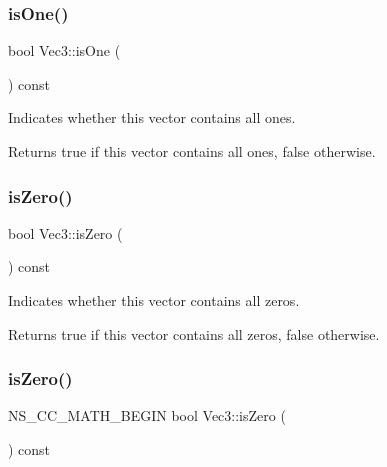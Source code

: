 \subsubsection{\texorpdfstring{is\+One()}{isOne()}\hspace{0.1cm}{\footnotesize\ttfamily [2/2]}}
{\footnotesize\ttfamily bool Vec3\+::is\+One (\begin{DoxyParamCaption}{ }\end{DoxyParamCaption}) const\hspace{0.3cm}{\ttfamily [inline]}}

Indicates whether this vector contains all ones.

\begin{DoxyReturn}{Returns}
true if this vector contains all ones, false otherwise. 
\end{DoxyReturn}
\mbox{\label{classVec3_ad6353b2ce203bb6ae4ae44317b00f86c}} 
\subsubsection{\texorpdfstring{is\+Zero()}{isZero()}\hspace{0.1cm}{\footnotesize\ttfamily [1/2]}}
{\footnotesize\ttfamily bool Vec3\+::is\+Zero (\begin{DoxyParamCaption}{ }\end{DoxyParamCaption}) const\hspace{0.3cm}{\ttfamily [inline]}}

Indicates whether this vector contains all zeros.

\begin{DoxyReturn}{Returns}
true if this vector contains all zeros, false otherwise. 
\end{DoxyReturn}
\mbox{\label{classVec3_a614a019ea8f0028d86bb9b6738e39339}} 
\subsubsection{\texorpdfstring{is\+Zero()}{isZero()}\hspace{0.1cm}{\footnotesize\ttfamily [2/2]}}
{\footnotesize\ttfamily N\+S\+\_\+\+C\+C\+\_\+\+M\+A\+T\+H\+\_\+\+B\+E\+G\+IN bool Vec3\+::is\+Zero (\begin{DoxyParamCaption}{ }\end{DoxyParamCaption}) const\hspace{0.3cm}{\ttfamily [inline]}}

